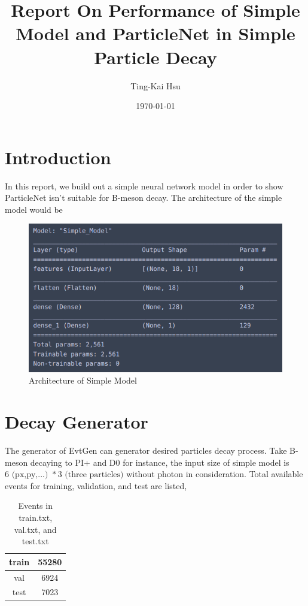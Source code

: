 \documentclass[12pt]{article}
\title{Report On Performance of Simple Model and ParticleNet in Simple Particle Decay}
\author{Ting-Kai Hsu}
\date{\today}
\numberwithin{equation}{section}
\begin{document}
\maketitle
\tableofcontents
\section{Introduction}
In this report, we build out a simple neural network model in order to show ParticleNet isn't suitable for B-meson decay.
The architecture of the simple model would be
\begin{figure}[H]
    \centering
    \includegraphics[width=0.75\linewidth]{Screenshot from 2024-06-22 00-15-47.png}
    \caption{Architecture of Simple Model}
    \label{1}
\end{figure}
\section{Decay Generator}
The generator of EvtGen can generator desired particles decay process.
Take B-meson decaying to PI+ and D0 for instance, the input size of simple model is $6\text{ (px,py,...) }*3\text{ (three particles)}$ without photon in consideration.
Total available events for training, validation, and test are listed,
\begin{table}[H]
    \centering
    \caption{Events in train.txt, val.txt, and test.txt}
        \begin{tabular}{|c|c|}
        \hline
        train & 55280\\
        \hline
        val & 6924\\
        \hline
        test & 7023\\
        \hline
        \end{tabular}
    \label{label}
\end{table}
\end{document}
